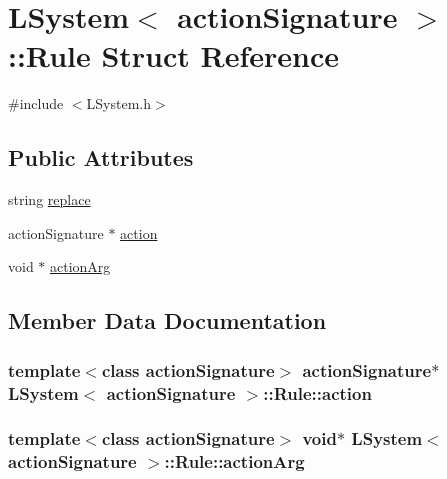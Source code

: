 \hypertarget{struct_l_system_1_1_rule}{}\section{L\+System$<$ action\+Signature $>$\+:\+:Rule Struct Reference}
\label{struct_l_system_1_1_rule}


{\ttfamily \#include $<$L\+System.\+h$>$}

\subsection*{Public Attributes}
\begin{DoxyCompactItemize}
\item 
string \hyperlink{struct_l_system_1_1_rule_a3b76bab5ac7d5db02bc8353dcb89027b}{replace}
\item 
action\+Signature $\ast$ \hyperlink{struct_l_system_1_1_rule_a372a79f55104cd99f95d5bc77f0bd23e}{action}
\item 
void $\ast$ \hyperlink{struct_l_system_1_1_rule_aaa3b261d80dca0dc871dca0923752f66}{action\+Arg}
\end{DoxyCompactItemize}


\subsection{Member Data Documentation}
\subsubsection[{\texorpdfstring{action}{action}}]{\setlength{\rightskip}{0pt plus 5cm}template$<$class action\+Signature$>$ action\+Signature$\ast$ {\bf L\+System}$<$ action\+Signature $>$\+::Rule\+::action}\hypertarget{struct_l_system_1_1_rule_a372a79f55104cd99f95d5bc77f0bd23e}{}\label{struct_l_system_1_1_rule_a372a79f55104cd99f95d5bc77f0bd23e}
\subsubsection[{\texorpdfstring{action\+Arg}{actionArg}}]{\setlength{\rightskip}{0pt plus 5cm}template$<$class action\+Signature$>$ void$\ast$ {\bf L\+System}$<$ action\+Signature $>$\+::Rule\+::action\+Arg}\hypertarget{struct_l_system_1_1_rule_aaa3b261d80dca0dc871dca0923752f66}{}\label{struct_l_system_1_1_rule_aaa3b261d80dca0dc871dca0923752f66}
